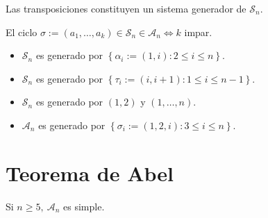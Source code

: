 \begin{lema}
Las transposiciones constituyen un sistema generador de $\mathcal{S}_n$.
\end{lema}

\begin{prop}
El ciclo $\sigma := \left( a_1, \ldots, a_k \right) \in \mathcal{S}_n \in \mathcal{A}_n \Leftrightarrow k$ impar.
\end{prop}

\begin{prop}
\begin{itemize}
\item $\mathcal{S}_n$ es generado por $\left\{ \alpha_i := \left( 1, i \right): 2 \le i \le n \right\}$.
\item $\mathcal{S}_n$ es generado por $\left\{ \tau_i := \left( i, i+1 \right) : 1 \le i \le n-1 \right\}$.
\item $\mathcal{S}_n$ es generado por $\left( 1, 2 \right)$ y $\left( 1, \ldots, n \right)$.
\item $\mathcal{A}_n$ es generado por $\left\{ \sigma_i := \left( 1, 2, i \right) : 3 \le i \le n \right\}$.
\end{itemize} 
\end{prop}

\section{Teorema de Abel}
%
\begin{theo}[De Abel]
Si $n \ge 5,\ \mathcal{A}_n$ es simple.
\end{theo}

